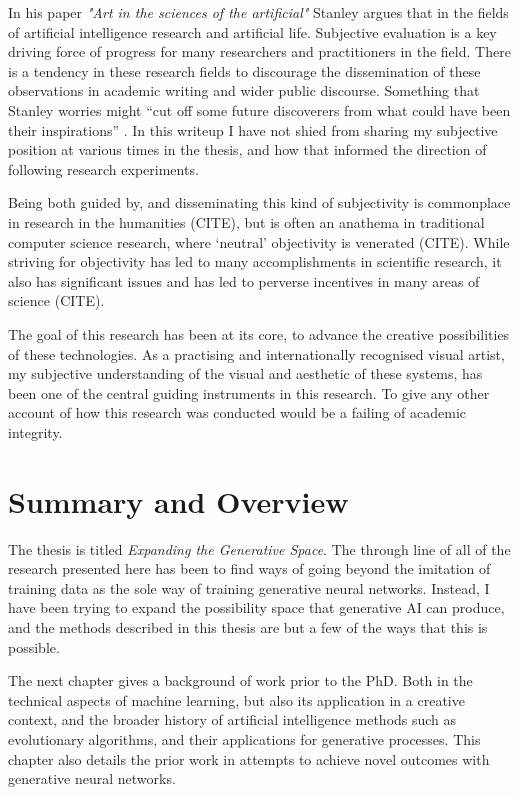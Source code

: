 In his paper \textit{"Art in the sciences of the artificial"} Stanley argues that in the fields of artificial intelligence research and artificial life. 
Subjective evaluation is a key driving force of progress for many researchers and practitioners in the field. 
There is a tendency in these research fields to discourage the dissemination of these observations in academic writing and wider public discourse. 
Something that Stanley worries might “cut off some future discoverers from what could have been their inspirations” \citep{stanley2018art}. 
In this writeup I have not shied from sharing my subjective position at various times in the thesis, and how that informed the direction of following research experiments.

Being both guided by, and disseminating this kind of subjectivity is commonplace in research in the humanities (CITE), but is often an anathema in traditional computer science research, where ‘neutral’ objectivity is venerated (CITE). 
While striving for objectivity has led to many accomplishments in scientific research, it also has significant issues and has led to perverse incentives in many areas of science (CITE). 

The goal of this research has been at its core, to advance the creative possibilities of these technologies. 
As a practising and internationally recognised visual artist, my subjective understanding of the visual and aesthetic of these systems, has been one of the central guiding instruments in this research. 
To give any other account of how this research was conducted would be a failing of academic integrity. 

\section{Summary and Overview}

The thesis is titled \textit{Expanding the Generative Space}. 
The through line of all of the research presented here has been to find ways of going beyond the imitation of training data as the sole way of training generative neural networks. 
Instead, I have been trying to expand the possibility space that generative AI can produce, and the methods described in this thesis are but a few of the ways that this is possible. 

The next chapter gives a background of work prior to the PhD. 
Both in the technical aspects of machine learning, but also its application in a creative context, and the broader history of artificial intelligence methods such as evolutionary algorithms, and their applications for generative processes. 
This chapter also details the prior work in attempts to achieve novel outcomes with generative neural networks.

